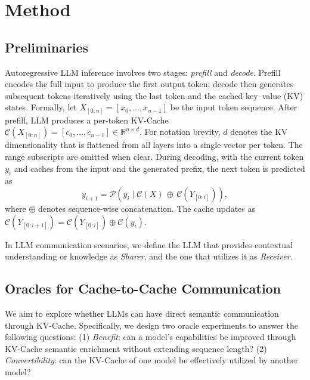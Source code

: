 \section{Method}
\label{sec:method}

\subsection{Preliminaries}

 Autoregressive LLM inference involves two stages: \emph{prefill} and \emph{decode}. Prefill encodes the full input to produce the first output token; decode then generates subsequent tokens iteratively using the last token and the cached key–value (KV) states.
Formally, let $X_{[0:n]} = [x_0,\dots,x_{n-1}]$ be the input token sequence. 
After prefill, LLM produces a per-token KV-Cache
$\mathcal{C}(X_{[0:n]}) = [c_0,\dots,c_{n-1}] \in \mathbb{R}^{n \times d}$.
For notation brevity, $d$ denotes the KV dimensionality that is flattened from all layers into a single vector per token.
The range subscripts are omitted when clear.
During decoding, with the current token $y_i$ and caches from the input and the generated prefix, the next token is predicted as
\begin{equation}
    y_{i+1} = \mathcal{P}\!\left(y_i \mid \mathcal{C}(X)\, \oplus\, \mathcal{C}(Y_{[0:i]})\right),
    \label{eq:llm_decode}
\end{equation}
where $\oplus$ denotes sequence-wise concatenation. 
The cache updates as $\mathcal{C}(Y_{[0:i+1]}) = \mathcal{C}(Y_{[0:i]}) \oplus \mathcal{C}(y_i)$.

In LLM communication scenarios, we define the LLM that provides contextual understanding or knowledge as \emph{Sharer}, and the one that utilizes it as \emph{Receiver}.

\subsection{Oracles for Cache-to-Cache Communication}
\label{sec:oracle}

We aim to explore whether LLMs can have direct semantic communication through KV-Cache.
Specifically, we design two oracle experiments to answer the following questions:
(1) \emph{Benefit}: can a model's capabilities be improved through KV-Cache semantic enrichment without extending sequence length?
(2) \emph{Convertibility}: can the KV-Cache of one model be effectively utilized by another model?

